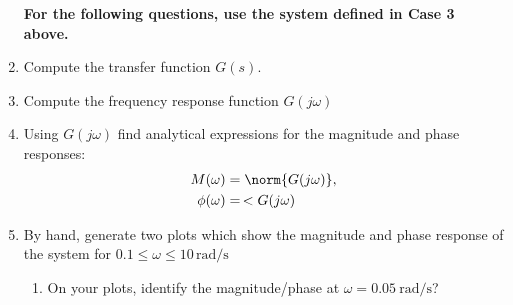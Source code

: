 \documentclass[11pt, reqno]{article}    %
\begin{document}
\begin{enumerate}
\begin{enumerate}
    \end{enumerate}
    \textbf{For the following questions, use the system defined in Case 3 above.}
    \item Compute the transfer function \( G(s) \). 
    \item Compute the frequency response function \( G(j \omega)\)
    \item Using \( G(j \omega) \) find analytical expressions for the magnitude and phase responses:
    \begin{align*}
        M(\omega) &= \norm{G(j \omega)}, \\
        \phi(\omega) &=\, < G(j \omega)
    \end{align*}
    \item By hand, generate two plots which show the magnitude and phase response of the system for \( 0.1 \leq \omega \leq 10 \, \si{\radian\per\second}\)
        \begin{enumerate}
            \item On your plots, identify the magnitude/phase at \( \omega = \SI{0.05}{\radian\per\second}\)?
        \end{enumerate}
\end{enumerate}
\end{document}
